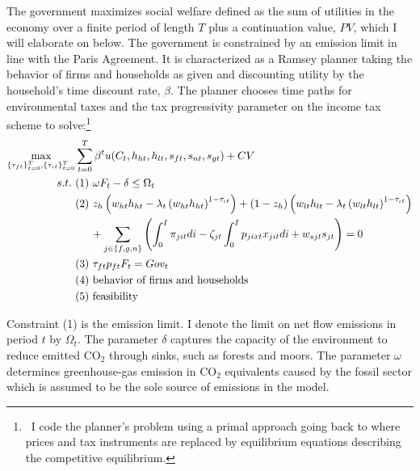 The government maximizes social welfare defined as the sum of utilities in the economy over a finite period of length $T$ plus a continuation value, $PV$, which I will elaborate on below. The government is constrained by an emission limit in line with the Paris Agreement.  
It is characterized as a Ramsey planner taking the behavior of firms and households as given and discounting utility by the household's time discount rate, $\beta$.
The planner chooses time paths for environmental taxes and the tax progressivity parameter on the income tax scheme to solve:\footnote{\ I code the planner's problem using a primal approach going back to \cite{Lucas1983OptimalCapital} where prices and tax instruments are replaced by equilibrium equations describing the competitive equilibrium. }
\begin{align*}
\underset{\{\tau_{ft}\}_{t=0}^{T},\{\tau_{\iota t}\}_{t=0}^{T}}{\max}&\sum_{t=0}^{T}\beta^t u(C_{t}, h_{ht}, h_{lt}, s_{ft}, s_{nt}, s_{gt})%
+ CV\\
s.t.\ %
& (1)\ \omega F_{t} -\delta \leq \Omega_t %
\\ %
& (2)\ z_h\left(w_{ht}h_{ht}-\lambda_t \left(w_{ht}h_{ht}\right)^{1-\tau_{\iota t}}\right)+(1-z_h)\left(w_{lt}h_{lt}-\lambda_t\left(w_{lt}h_{lt}\right)^{1-\tau_{\iota t}}\right) \\
& \hspace{5mm} +\sum_{j\in\{f,g,n\}}\left(\int_{0}^{I}\pi_{jit}di-\zeta_{jt}\int_{0}^{I}p_{jixt}x_{jit}di+w_{sjt}s_{jt}\right)= 0\\ %
& (3)\ \tau_{ft}p_{ft}F_{t} = Gov_t\\
& (4)\ \text{behavior of firms and households}\\
& (5)\ \text{feasibility}
\end{align*}

Constraint (1) is the emission limit. I denote the limit on net flow emissions in period $t$ by $\Omega_t$.  The parameter $\delta$ captures the capacity of the environment to reduce emitted CO$_2$ through sinks, such as forests and moors.  The parameter $\omega$ determines greenhouse-gas emission in CO$_2$ equivalents caused by the fossil sector which is assumed to be the sole source of emissions in the model. %

